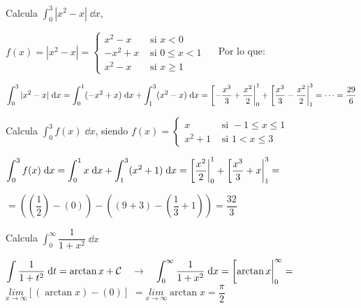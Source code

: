 \begin{ejre}
Calcula $\displaystyle \int_0^3 |x^2-x|\; \dd x$, 
\end{ejre}
\begin{proofw}\renewcommand{\qedsymbol}{$\diamond$}	

$f(x)=|x^2-x|=\begin{cases}
x^2-x & \text{ si } x<0 \\
-x^2+x & \text{ si } 0\le x < 1 \\
x^2-x & \text{ si } x\ge 1 	
\end{cases}\quad$ Por lo que:

$\displaystyle \int_0^3 |x^2-x|\; \dd x= \int_0^1 (-x^2+x) \; \dd x+\int_1^3 (x^2-x) \; \dd x=\eval[-\dfrac {x^3}{3}+\dfrac{x^2}{2}|_0^1 + \eval[\dfrac {x^3}{3}-\dfrac{x^2}{2}|_1^3= \cdots = \dfrac {29}{6}$	
\end{proofw}

\begin{ejre}
Calcula $\displaystyle \int_0^3 f(x)\; \dd x$, siendo
$f(x)=\begin{cases}
x &  \text{ si } -1\le x \le 1 \\
x^2+1	& \text{ si } 1 < x \le 3
\end{cases}$
	
\end{ejre}
\begin{proofw}\renewcommand{\qedsymbol}{$\diamond$}	

$\displaystyle \int_0^3 f(x)\; \dd x= \int_0^1 x \; \dd x + \int_1^3  (x^2+1)\; \dd x= \eval[\dfrac {x^2}{2}|_0^1 + \eval[\dfrac {x^3}{3}+ x|_1^3 =$

$= \left( (\dfrac 1 2 )- (0) \right)- \left( (9+3)-(\dfrac 1 3 + 1)   \right) = \dfrac {32}{3}$
	
\end{proofw}

\begin{ejre}
	Calcula $\displaystyle \int_0^{\infty} \dfrac {1}{1+x^2}\; \dd x$
\end{ejre}
\begin{proofw}\renewcommand{\qedsymbol}{$\diamond$}	

$\displaystyle \int \dfrac {1}{1+t^2}\; \dd t = \arctan x + \mathcal C \quad \to \quad \displaystyle \int_0^{\infty} \dfrac {1}{1+x^2}\; \dd x=\eval[\arctan x|_0^{\infty}= $
$\underset {x\to \infty}{lim} \left[ (\arctan x) - (0) \right]$
$=\underset {x\to \infty}{lim}{\arctan x}=\dfrac {\pi}{2}$

\end{proofw}
	
